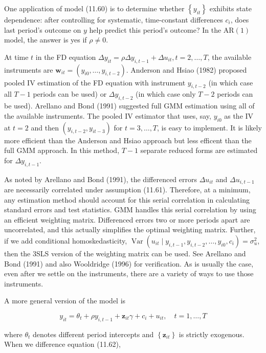 \documentclass[10pt]{article}
\begin{document}
One application of model (11.60) is to determine whether $\left\{y_{i t}\right\}$ exhibits state dependence: after controlling for systematic, time-constant differences $c_{i}$, does last period's outcome on $y$ help predict this period's outcome? In the $\mathrm{AR}(1)$ model, the answer is yes if $\rho \neq 0$.

At time $t$ in the FD equation $\Delta y_{i t}=\rho \Delta y_{i, t-1}+\Delta u_{i t}, t=2, \ldots, T$, the available instruments are $\mathbf{w}_{i t}=\left(y_{i 0}, \ldots, y_{i, t-2}\right)$. Anderson and Hsiao (1982) proposed pooled IV estimation of the FD equation with instrument $y_{i, t-2}$ (in which case all $T-1$ periods can be used) or $\Delta y_{i, t-2}$ (in which case only $T-2$ periods can be used). Arellano and Bond (1991) suggested full GMM estimation using all of the available instruments. The pooled IV estimator that uses, say, $y_{i 0}$ as the IV at $t=2$ and then $\left(y_{i, t-2}, y_{i t-3}\right)$ for $t=3, \ldots, T$, is easy to implement. It is likely more efficient than the Anderson and Hsiao approach but less efficent than the full GMM approach. In this method, $T-1$ separate reduced forms are estimated for $\Delta y_{i, t-1}$.

As noted by Arellano and Bond (1991), the differenced errors $\Delta u_{i t}$ and $\Delta u_{i, t-1}$ are necessarily correlated under assumption (11.61). Therefore, at a minimum, any estimation method should account for this serial correlation in calculating standard errors and test statistics. GMM handles this serial correlation by using an efficient weighting matrix. Differenced errors two or more periods apart are uncorrelated, and this actually simplifies the optimal weighting matrix. Further, if we add conditional homoskedasticity, $\operatorname{Var}\left(u_{i t} \mid y_{i, t-1}, y_{i, t-2}, \ldots, y_{i 0}, c_{i}\right)=\sigma_{u}^{2}$, then the 3SLS version of the weighting matrix can be used. See Arellano and Bond (1991) and also Wooldridge (1996) for verification. As is usually the case, even after we settle on the instruments, there are a variety of ways to use those instruments.

A more general version of the model is


\begin{equation*}
y_{i t}=\theta_{t}+\rho y_{i, t-1}+\mathbf{z}_{i t} \gamma+c_{i}+u_{i t}, \quad t=1, \ldots, T \tag{11.62}
\end{equation*}


where $\theta_{t}$ denotes different period intercepts and $\left\{\mathbf{z}_{i t}\right\}$ is strictly exogenous. When we difference equation (11.62),
\end{document}
